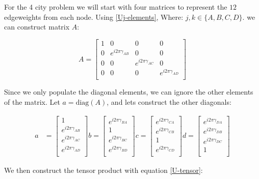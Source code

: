 \documentclass[msc,oneside]{ubcthesis}
\begin{document}
	For the 4 city problem we will start with four matrices to represent the $12$ edgeweights from each node. Using \ref{Uj-elements}, Where:	$ j, k \in \{A,B,C,D\}$.  we can construct matrix $A$:

	$$
	A = \begin{bmatrix}
		1 & 0 & 0 & 0 \\
		0 & e^{i2\pi\gamma_{AB}} & 0 & 0 \\
		0 & 0 & e^{i2\pi\gamma_{AC}} & 0 \\
		0 & 0 & 0 & e^{i2\pi\gamma_{AD}} \\
	\end{bmatrix}
	$$
	
	Since we only populate the diagonal elements, we can ignore the other elements of the matrix. Let $ a = \mathrm{diag}(A)$, and lets construct the other diagonals:
	
	\begin{align*}	
		a & = \begin{bmatrix}
			1 \\
			e^{i2\pi\gamma_{AB}} \\
			e^{i2\pi\gamma_{AC}} \\
			e^{i2\pi\gamma_{AD}} \\
		\end{bmatrix} 
		b  = \begin{bmatrix}
			e^{i2\pi\gamma_{BA}} \\
			1 \\
			e^{i2\pi\gamma_{BC}} \\
			e^{i2\pi\gamma_{BD}} \\
		\end{bmatrix}
		c  = \begin{bmatrix}
			e^{i2\pi\gamma_{CA}} \\
			e^{i2\pi\gamma_{CB}} \\
			1 \\
			e^{i2\pi\gamma_{CD}} \\
		\end{bmatrix} 
		d = \begin{bmatrix}
			e^{i2\pi\gamma_{DA}} \\
			e^{i2\pi\gamma_{DB}} \\
			e^{i2\pi\gamma_{DC}} \\
			1 \\
		\end{bmatrix} 						 			
	\end{align*}
	
	
	We then construct the tensor product with equation \ref{U-tensor}:
	
\end{document}
